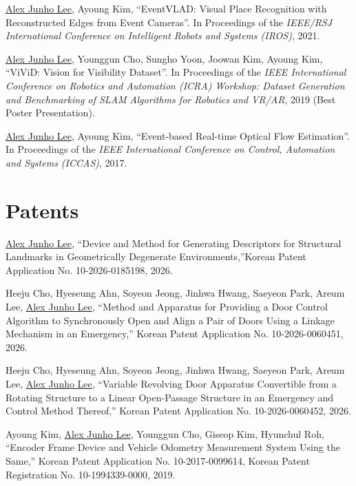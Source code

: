 \documentclass[margin]{res}
\begin{document}
\begin{resume}
		\par\underline{Alex Junho Lee}, Ayoung Kim, ``EventVLAD: Visual Place Recognition with Reconstructed Edges from Event Cameras''. In Proceedings of the \textit{IEEE/RSJ International Conference on Intelligent Robots and Systems (IROS)}, 2021.

		\par\underline{Alex Junho Lee}, Younggun Cho, Sungho Yoon, Joowan Kim, Ayoung Kim, ``ViViD: Vision for Visibility Dataset''. In Proceedings of the \textit{IEEE International Conference on Robotics and Automation (ICRA) Workshop: Dataset Generation and Benchmarking of SLAM Algorithms for Robotics and VR/AR}, 2019 (Best Poster Presentation).

		\par\underline{Alex Junho Lee}, Ayoung Kim, ``Event-based Real-time Optical Flow Estimation''. In Proceedings of the \textit{IEEE International Conference on Control, Automation and Systems (ICCAS)}, 2017.
		
				

		\section{Patents}
		\par \underline{Alex Junho Lee}, ``Device and Method for Generating Descriptors for Structural Landmarks in Geometrically Degenerate Environments,''\newline Korean Patent Application No. \mbox{10-2026-0185198}, 2026.

		\par Heeju Cho, Hyeseung Ahn, Soyeon Jeong, Jinhwa Hwang, Saeyeon Park, Areum Lee, \underline{Alex Junho Lee}, ``Method and Apparatus for Providing a Door Control Algorithm to Synchronously Open and Align a Pair of Doors Using a Linkage Mechanism in an Emergency,'' Korean Patent Application No. 10-2026-0060451, 2026.

		\par Heeju Cho, Hyeseung Ahn, Soyeon Jeong, Jinhwa Hwang, Saeyeon Park, Areum Lee, \underline{Alex Junho Lee}, ``Variable Revolving Door Apparatus Convertible from a Rotating Structure to a Linear Open-Passage Structure in an Emergency and Control Method Thereof,'' Korean Patent Application No. 10-2026-0060452, 2026.

		\par Ayoung Kim, \underline{Alex Junho Lee}, Younggun Cho, Giseop Kim, Hyunchul Roh, ``Encoder Frame Device and Vehicle Odometry Measurement System Using the Same,'' Korean Patent Application No. 10-2017-0099614, Korean Patent Registration No. 10-1994339-0000, 2019.



\end{resume}
\end{document}
